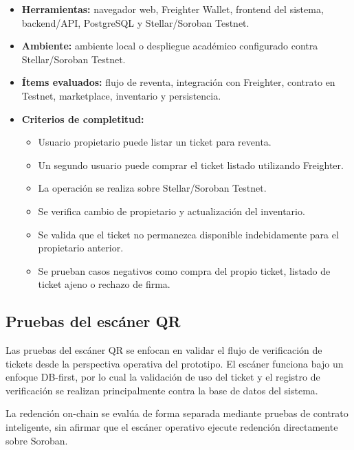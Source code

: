 \documentclass[12pt,letterpaper]{article}
\begin{document}
\begin{itemize}
    \item \textbf{Herramientas:} navegador web, Freighter Wallet, frontend del sistema, backend/API, PostgreSQL y Stellar/Soroban Testnet.
    \item \textbf{Ambiente:} ambiente local o despliegue académico configurado contra Stellar/Soroban Testnet.
    \item \textbf{Ítems evaluados:} flujo de reventa, integración con Freighter, contrato en Testnet, marketplace, inventario y persistencia.
    \item \textbf{Criterios de completitud:}
    \begin{itemize}
        \item Usuario propietario puede listar un ticket para reventa.
        \item Un segundo usuario puede comprar el ticket listado utilizando Freighter.
        \item La operación se realiza sobre Stellar/Soroban Testnet.
        \item Se verifica cambio de propietario y actualización del inventario.
        \item Se valida que el ticket no permanezca disponible indebidamente para el propietario anterior.
        \item Se prueban casos negativos como compra del propio ticket, listado de ticket ajeno o rechazo de firma.
    \end{itemize}
\end{itemize}

\subsection{Pruebas del escáner QR}

Las pruebas del escáner QR se enfocan en validar el flujo de verificación de tickets desde la perspectiva operativa del prototipo. El escáner funciona bajo un enfoque DB-first, por lo cual la validación de uso del ticket y el registro de verificación se realizan principalmente contra la base de datos del sistema.

La redención on-chain se evalúa de forma separada mediante pruebas de contrato inteligente, sin afirmar que el escáner operativo ejecute redención directamente sobre Soroban.
\end{document}
